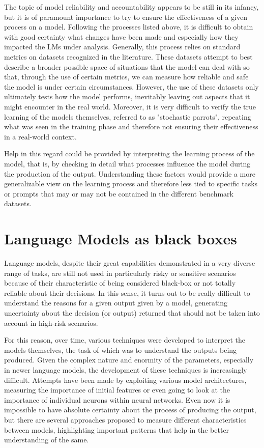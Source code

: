 The topic of model reliability and accountability appears to be still in its infancy, but it is of paramount importance to try to ensure the effectiveness of a given process on a model. Following the processes listed above, it is difficult to obtain with good certainty what changes have been made and especially how they impacted the LMs under analysis. Generally, this process relies on standard metrics on datasets recognized in the literature. These datasets attempt to best describe a broader possible space of situations that the model can deal with so that, through the use of certain metrics, we can measure how reliable and safe the model is under certain circumstances. However, the use of these datasets only ultimately tests how the model performs, inevitably leaving out aspects that it might encounter in the real world. Moreover, it is very difficult to verify the true learning of the models themselves, referred to as "stochastic parrots", repeating what was seen in the training phase and therefore not ensuring their effectiveness in a real-world context.

Help in this regard could be provided by interpreting the learning process of the model, that is, by checking in detail what processes influence the model during the production of the output. Understanding these factors would provide a more generalizable view on the learning process and therefore less tied to specific tasks or prompts that may or may not be contained in the different benchmark datasets.

\section{Language Models as black boxes}

Language models, despite their great capabilities demonstrated in a very diverse range of tasks, are still not used in particularly risky or sensitive scenarios because of their characteristic of being considered black-box or not totally reliable about their decisions. In this sense, it turns out to be really difficult to understand the reasons for a given output given by a model, generating uncertainty about the decision (or output) returned that should not be taken into account in high-risk scenarios. 

For this reason, over time, various techniques were developed to interpret the models themselves, the task of which was to understand the outputs being produced. Given the complex nature and enormity of the parameters, especially in newer language models, the development of these techniques is increasingly difficult. Attempts have been made by exploiting various model architectures, measuring the importance of initial features or even going to look at the importance of individual neurons within neural networks. Even now it is impossible to have absolute certainty about the process of producing the output, but there are several approaches proposed to measure different characteristics between models, highlighting important patterns that help in the better understanding of the same.

